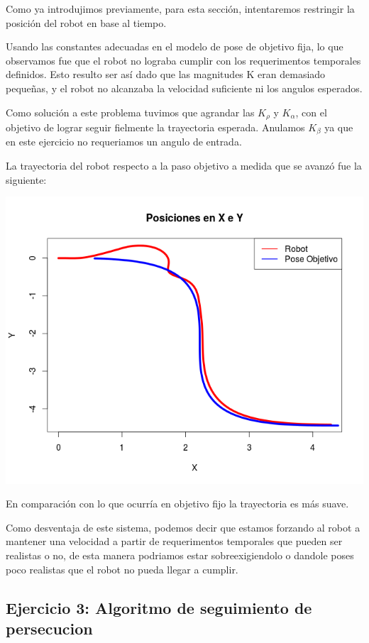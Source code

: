 Como ya introdujimos previamente, para esta sección, intentaremos restringir la posición del robot en base al tiempo.

Usando las constantes adecuadas en el modelo de pose de objetivo fija, lo que observamos fue que el robot no lograba cumplir con los requerimentos temporales definidos. Esto resulto ser así dado que las magnitudes K eran demasiado pequeñas, y el robot no alcanzaba la velocidad suficiente ni los angulos esperados.

Como solución a este problema tuvimos que agrandar las $K_\rho$ y $K_\alpha$, con el objetivo de lograr seguir fielmente la trayectoria esperada. Anulamos $K_\beta$ ya que en este ejercicio no requeriamos un angulo de entrada.

La trayectoria del robot respecto a la paso objetivo a medida que se avanzó fue la siguiente:

\begin{center}
\includegraphics[scale=0.5]{ejercicio2}
\end{center}

En comparación con lo que ocurría en objetivo fijo la trayectoria es más suave.

Como desventaja de este sistema, podemos decir que estamos forzando al robot a mantener una velocidad a partir de requerimentos temporales que pueden ser realistas o no, de esta manera podriamos estar sobreexigiendolo o dandole poses poco realistas que el robot no pueda llegar a cumplir.

\subsection{Ejercicio 3: Algoritmo de seguimiento de persecucion}

